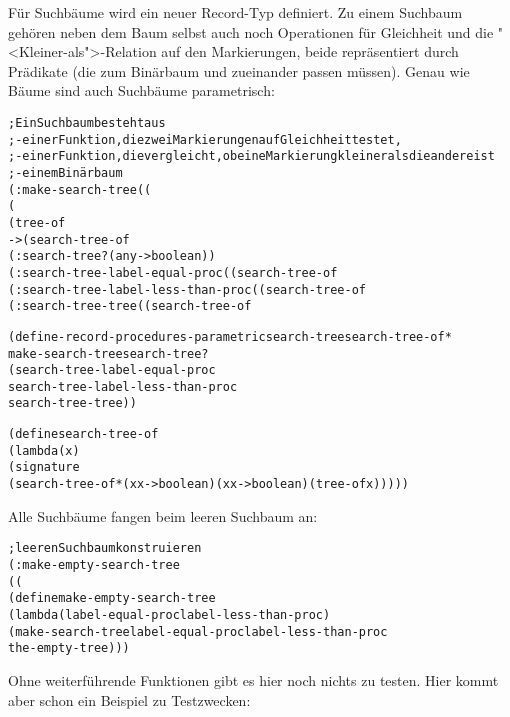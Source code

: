 Für Suchbäume wird ein neuer Record-Typ
definiert. Zu einem Suchbaum
gehören neben dem Baum selbst auch noch Operationen für
Gleichheit und die "<Kleiner-als">-Relation auf den Markierungen, beide repräsentiert durch
Prädikate (die zum Binärbaum und zueinander passen müssen).  Genau wie
Bäume sind auch Suchbäume parametrisch:
%
\begin{alltt}
; Ein Suchbaum besteht aus
; - einer Funktion, die zwei Markierungen auf Gleichheit testet,
; - einer Funktion, die vergleicht, ob eine Markierung kleiner als die andere ist
; - einem Binärbaum
(: make-search-tree ((%a %a -> boolean) 
                     (%a %a -> boolean) 
                     (tree-of %a) 
                         -> (search-tree-of %a)))
(: search-tree? (any -> boolean))
(: search-tree-label-equal-proc ((search-tree-of %a) -> (%a %a -> boolean)))
(: search-tree-label-less-than-proc ((search-tree-of %a) -> (%a %a -> boolean)))
(: search-tree-tree ((search-tree-of %a) -> (tree-of %a)))

(define-record-procedures-parametric search-tree search-tree-of*
  make-search-tree search-tree?
  (search-tree-label-equal-proc
   search-tree-label-less-than-proc
   search-tree-tree))

(define search-tree-of
  (lambda (x)
    (signature
     (search-tree-of* (x x -> boolean) (x x -> boolean) (tree-of x)))))
\end{alltt}
%
Alle Suchbäume fangen
beim leeren Suchbaum an:
%
\begin{alltt}
; leeren Suchbaum konstruieren
(: make-empty-search-tree
   ((%a %a -> boolean) (%a %a -> boolean) -> (search-tree-of %a)))
(define make-empty-search-tree
  (lambda (label-equal-proc label-less-than-proc)
    (make-search-tree label-equal-proc label-less-than-proc
                      the-empty-tree)))
\end{alltt}
%
Ohne weiterführende Funktionen gibt es hier noch nichts zu testen. Hier kommt
aber schon ein Beispiel zu Testzwecken:

